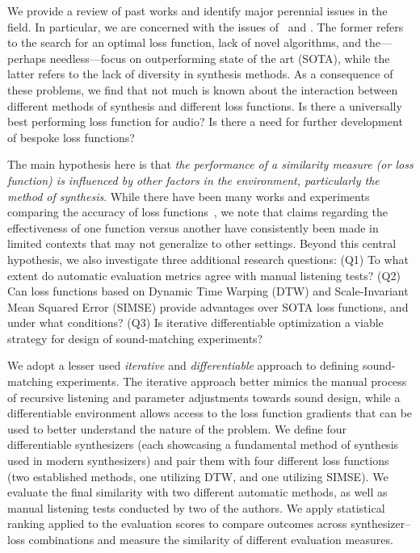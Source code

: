 We provide a review of past works and identify major perennial issues in the field. In particular, we are concerned with the issues of \LossSelect~and \SynthSelect. The former refers to the search for an optimal loss function, lack of novel algorithms, and the---perhaps needless---focus on outperforming state of the art (\gls{SOTA}), while the latter refers to the lack of diversity in synthesis methods. As a consequence of these problems, we find that not much is known about the interaction between different methods of synthesis and different loss functions. Is there a universally best performing loss function for audio? Is there a need for further development of bespoke loss functions?

The main hypothesis here is that \textit{the performance of a similarity measure (or loss function) is influenced by other factors in the environment, particularly the method of synthesis}. While there have been many works and experiments comparing the accuracy of loss functions~\cite{vahidi2023mesostructures,turian2020sorry,engel2020ddsp,uzrad2024diffmoog,han2023perceptual,masuda2021soundmatch,turian2020sorry,bruford2024synthesizer}, we note that claims regarding the effectiveness of one function versus another have consistently been made in limited contexts that may not generalize to other settings. Beyond this central hypothesis, we also investigate three additional research questions: (Q1) To what extent do automatic evaluation metrics agree with manual listening tests? (Q2) Can loss functions based on Dynamic Time Warping (DTW) and Scale-Invariant Mean Squared Error (SIMSE) provide advantages over SOTA loss functions, and under what conditions?
(Q3) Is iterative differentiable optimization a viable strategy for design of sound-matching experiments?

 We adopt a lesser used \textit{iterative} and \textit{differentiable} approach to defining sound-matching experiments. The iterative approach better mimics the manual process of recursive listening and parameter adjustments towards sound design, while a differentiable environment allows access to the loss function gradients that can be used to better understand the nature of the problem. We define four differentiable synthesizers (each showcasing a fundamental method of synthesis used in modern synthesizers) and pair them with four different loss functions (two established methods, one utilizing DTW, and one utilizing SIMSE). We evaluate the final similarity with two different automatic methods, as well as manual listening tests conducted by two of the authors. We apply statistical ranking applied to the evaluation scores to compare outcomes across synthesizer–loss combinations and measure the similarity of different evaluation measures. 

